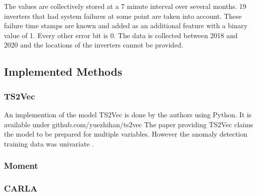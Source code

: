 The values are collectively stored at a 7 minute interval over several months. 19 inverters that had system failures at some point are taken into account. These failure time stamps are known and added as an additional feature with a binary value of 1. Every other error bit is 0. The data is collected between 2018 and 2020 and the locations of the inverters cannot be provided.


\subsection{Implemented Methods}
%

\subsubsection{TS2Vec}
An implemention of the model TS2Vec is done by the authors using Python. It is available under github.com/yuezhihan/ts2vec
The paper providing TS2Vec claims the model to be prepared for multiple variables. However the anomaly detection training data was univariate .

\subsubsection{Moment}

\subsubsection{CARLA}

